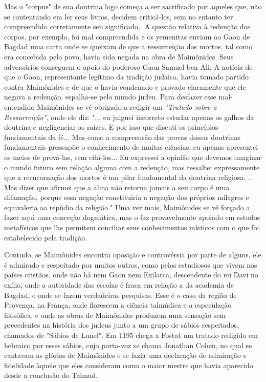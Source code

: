 \begin{itemize}
\begin{enumrate}
Mas o "corpus" de sua doutrina logo começa a ser sacrificado por aqueles
que, não se contentando em ler seus livros, decidem criticá-los, sem no
entanto ter compreendido corretamente seu significado,. A questão
relativa à redenção dos corpos, por exemplo, foi mal compreendida e os
yemenitas en­viam ao Gaon de Bagdad uma carta onde se queixam de que a
ressurreição dos mortos, tal como era concebida pelo povo, havia sido
negada na obra de
Maimônides. Seus adversários conseguem o apoio do poderoso Gaon Samuel
ben Ali. A notícia de que o Gaon, representante legítimo da tradição
judaica, havia tomado partido contra Maimônides e de que o havia
condenado e prova­do claramente que ele negava a redenção, espalha-se
pelo mundo judeu. Para desfazer esse mal-entendido Maimônides se vê
obrigado a redigir um \emph{"Tratado sobre a Ressurreição",} onde ele
diz: "... eu julguei incorreto estudar apenas os galhos da doutrina e
negligenciar as raízes. E por isso que discuti os princí­pios
fundamentais da fé... Mas como a compreensão das provas dessas
doutri­nas fundamentais pressupõe o conhecimento de muitas ciências, eu
apenas apre­sentei os meios de prová-las, sem citá-los... Eu expressei a
opinião que deve­mos imaginar o mundo futuro sem relação alguma com a
redenção, mas ressal­tei expressamente que a reencarnação dos mortos é
um pilar fundamental da doutrina religiosa. ... Mas dizer que afirmei
que a alma não retorna jamais a seu corpo é uma difamação, porque essa
negação constituiria a negação dos pró­prios milagres e equivaleria ao
repúdio da religião." Uma vez mais, Maimôni­des se vê forçado a fazer
aqui uma conceção dogmática, mas o faz provavel­mente apoiado em estudos
metafísicos que lhe permitem conciliar seus conhe­cimentos místicos com
o que foi estabelecido pela tradição.

Contudo, se Maimônides encontra oposição e controvérsia por par­te de
alguns, ele é admirado e respeitado por muitos outros, como pelos
estu­diosos que vivem nos países cristãos, onde não há nem Gaon nem
Exilarca, descendente do rei Davi no exílio, onde a autoridade das
escolas é fraca em relação a da academia de Bagdad, e onde se fazem
verdadeiras pesquisas. Esse é o caso da região de Provença, na França,
onde florescem a ciência talmúdica e a especulação filosófica, e onde as
obras de Maimônides produzem uma sen­sação sem precedentes na história
dos judeus junto a um grupo de sábios res­peitados, chamados de "Sábios
de Lunel". Em 1195 chega a Fostat um tratado redigido em hebraico por
esses sábios, cujo porta-voz se chama Jonathan Co­hen, no qual se
cantavam as glórias de Maimônides e se fazia uma declaração de admiração
e fidelidade àquele que eles consideram como o maior mestre que havia
aparecido desde a conclusão do Talmud.


\end{enumrate}
\end{itemize}
